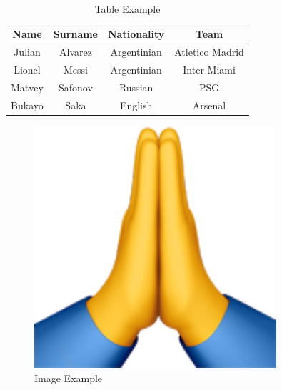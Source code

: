 \documentclass{article}
\begin{document}
\begin{table}[h]
\centering
\begin{tabular}{|c | c | c | c|}
\hline
Name & Surname & Nationality & Team \\
\hline
Julian & Alvarez & Argentinian & Atletico Madrid \\
Lionel & Messi & Argentinian & Inter Miami \\
Matvey & Safonov & Russian & PSG \\
Bukayo & Saka & English & Arsenal \\
\hline
\end{tabular}
\caption{Table Example}
\end{table}
\begin{figure}[h]
\centering
\includegraphics[width=0.8\textwidth]{hand.png}
\caption{Image Example}
\end{figure}
\end{document}
